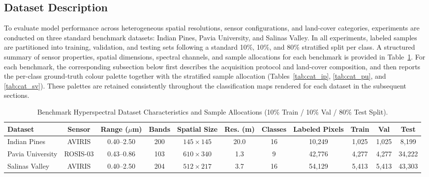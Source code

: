 \documentclass[manuscript,screen,review]{acmart}
\begin{document}
\subsection{Dataset Description}
\label{subsec:datasets}
To evaluate model performance across heterogeneous spatial resolutions, sensor configurations, and land-cover categories, experiments are conducted on three standard benchmark datasets: Indian Pines, Pavia University, and Salinas Valley. In all experiments, labeled samples are partitioned into training, validation, and testing sets following a standard 10\%, 10\%, and 80\% stratified split per class. A structured summary of sensor properties, spatial dimensions, spectral channels, and sample allocations for each benchmark is provided in Table~\ref{tab:dataset_summary}. For each benchmark, the corresponding subsection below first describes the acquisition protocol and land-cover composition, and then reports the per-class ground-truth colour palette together with the stratified sample allocation (Tables~\ref{tab:cat_ip}, \ref{tab:cat_pu}, and \ref{tab:cat_sv}). These palettes are retained consistently throughout the classification maps rendered for each dataset in the subsequent sections.

\begin{table}[t]
\centering
\footnotesize
\caption{Benchmark Hyperspectral Dataset Characteristics and Sample Allocations (10\% Train / 10\% Val / 80\% Test Split).}
\label{tab:dataset_summary}
\begin{tabular*}{\textwidth}{@{\extracolsep{\fill}}lcccccccccc}
\toprule
\textbf{Dataset} & \textbf{Sensor} & \textbf{Range ($\mu$m)} & \textbf{Bands} & \textbf{Spatial Size} & \textbf{Res. (m)} & \textbf{Classes} & \textbf{Labeled Pixels} & \textbf{Train} & \textbf{Val} & \textbf{Test} \\
\midrule
Indian Pines        & AVIRIS   & 0.40--2.50 & 200 & $145 \times 145$ & 20.0 & 16 & 10,249 & 1,025 & 1,025 & 8,199  \\
Pavia University    & ROSIS-03 & 0.43--0.86 & 103 & $610 \times 340$ &  1.3 &  9 & 42,776 & 4,277 & 4,277 & 34,222 \\
Salinas Valley      & AVIRIS   & 0.40--2.50 & 204 & $512 \times 217$ &  3.7 & 16 & 54,129 & 5,413 & 5,413 & 43,303 \\
\bottomrule
\end{tabular*}
\end{table}
\end{document}
